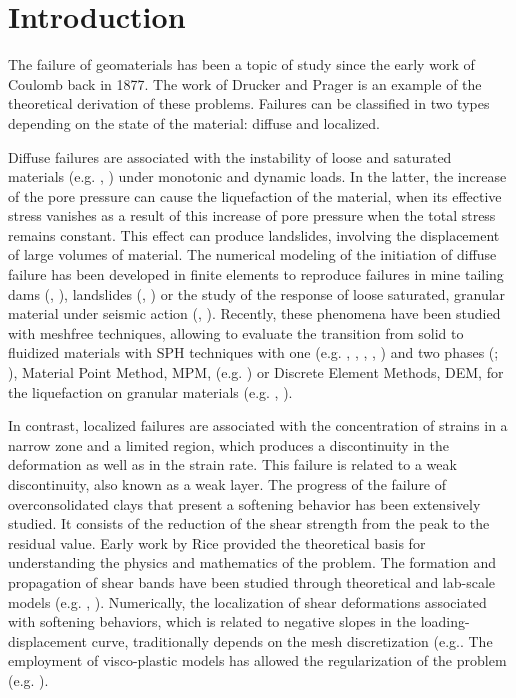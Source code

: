 \documentclass[applsci,journal,article,submit,moreauthors,pdftex]{Definitions/mdpi}
\begin{document}
\section{Introduction}
The failure of geomaterials has been a topic of study since the early work of Coulomb back in 1877. The work of Drucker and Prager \cite{Drucker-Prager} is an example of the theoretical derivation of these problems. Failures can be classified in two types depending on the state of the material: diffuse and localized.

Diffuse failures are associated with the instability of loose and saturated materials (e.g. \cite{DarveLaouafa2000}, \cite{Pastor2009b}) under monotonic and dynamic loads. In the latter, the increase of the pore pressure can cause the liquefaction of the material, when its effective stress vanishes as a result of this increase of pore pressure when the total stress remains constant. This effect can produce landslides, involving the displacement of large volumes of material. The numerical modeling of the initiation of diffuse failure has been developed in finite elements to reproduce failures in mine tailing dams (\cite{Ledesma2021}, \cite{Ledesma2022}), landslides (\cite{Laouafa2002}, \cite{FernandezMerodo2004}) or the study of the response of loose saturated, granular material under seismic action (\cite{LopezQuerolB2006}, \cite{Manzanal2021}). Recently, these phenomena have been studied with meshfree techniques, allowing to evaluate the transition from solid to fluidized materials with SPH techniques with one (e.g. \cite{Pastor2009b}, \cite{Manzanal2016}, \cite{Dutto2017}, \cite{Longo2019}, \cite{Lin2019}) and two phases (\cite{Pastor2017}; \cite{Pastor2021}), Material Point Method, MPM, (e.g. \cite{Zaba2011,Yerro:2015,Yerro:2016,CUOMO2021}) or Discrete Element Methods, DEM, for the liquefaction on granular materials (e.g. \cite{Feng2021}, \cite{SIZKOW2021}).

In contrast, localized failures are associated with the concentration of strains in a narrow zone and a limited region, which produces a discontinuity in the deformation as well as in the strain rate. This failure is related to a weak discontinuity, also known as a weak layer. The progress of the failure of overconsolidated clays that present a softening behavior has been extensively studied. It consists of the reduction of the shear strength from the peak to the residual value. Early work by Rice \cite{Rice1973} provided the theoretical basis for understanding the physics and mathematics of the problem. The formation and propagation of shear bands have been studied through theoretical and lab-scale models (e.g. \cite{Desrues_1984}, \cite{Sulem1995}). Numerically, the localization of shear deformations associated with softening behaviors, which is related to negative slopes in the loading-displacement curve, traditionally depends on the mesh discretization (e.g.\cite{Wang:1997}. The employment of visco-plastic models has allowed the regularization of the problem (e.g. \cite{GutierreDeBort}).
\end{document}
